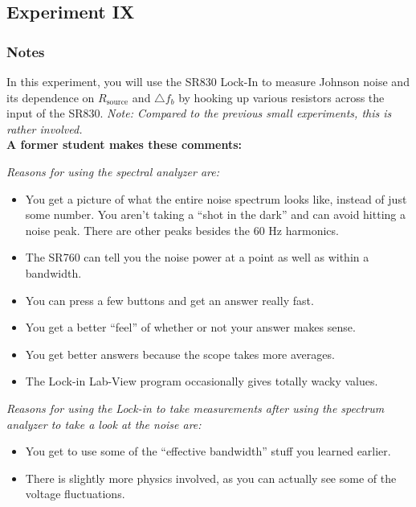 \documentclass{../lab}
\begin{document}
\subsection{Experiment IX}

\subsubsection{Notes}

In this experiment, you will use the SR830 Lock-In to measure Johnson noise and its dependence on $ R_\text{source} $ and $ \triangle f_b $ by hooking up various resistors across the input of the SR830. \emph{Note: Compared to the previous small experiments, this is rather involved.}\\

\noindent\textbf{A former student makes these comments:}

\noindent\emph{Reasons for using the spectral analyzer are:}

\begin{itemize}
    \item You get a picture of what the entire noise spectrum looks like, instead of just some number. You aren't taking a ``shot in the dark'' and can avoid hitting a noise peak. There are other peaks besides the 60 Hz harmonics.

    \item The SR760 can tell you the noise power at a point as well as within a bandwidth.

    \item You can press a few buttons and get an answer really fast.

    \item You get a better ``feel'' of whether or not your answer makes sense.

    \item You get better answers because the scope takes more averages.

    \item The Lock-in Lab-View program occasionally gives totally wacky values.
\end{itemize}

\noindent\emph{Reasons for using the Lock-in to take measurements after using the spectrum analyzer to take a look at the noise are:}

\begin{itemize}
    \item You get to use some of the ``effective bandwidth'' stuff you learned earlier.

    \item There is slightly more physics involved, as you can actually see some of the voltage fluctuations.

\end{itemize}
\end{document}
